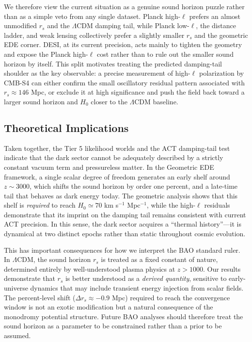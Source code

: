 \documentclass[a4paper,11pt]{article}
\begin{document}
We therefore view the current situation as a genuine sound horizon puzzle rather than as a simple veto from any single dataset. Planck high-$\ell$ prefers an almost unmodified $r_s$ and the $\Lambda$CDM damping tail, while Planck low-$\ell$, the distance ladder, and weak lensing collectively prefer a slightly smaller $r_s$ and the geometric EDE corner. DESI, at its current precision, acts mainly to tighten the geometry and expose the Planck high-$\ell$ cost rather than to rule out the smaller sound horizon by itself. This split motivates treating the predicted damping-tail shoulder as the key observable: a precise measurement of high-$\ell$ polarization by CMB-S4 can either confirm the small oscillatory residual pattern associated with $r_s \approx 146$ Mpc, or exclude it at high significance and push the field back toward a larger sound horizon and $H_0$ closer to the $\Lambda$CDM baseline.

\subsection*{Theoretical Implications}

Taken together, the Tier 5 likelihood worlds and the ACT damping-tail test indicate that the dark sector cannot be adequately described by a strictly constant vacuum term and pressureless matter. In the Geometric EDE framework, a single scalar degree of freedom generates an early shelf around $z \sim 3000$, which shifts the sound horizon by order one percent, and a late-time tail that behaves as dark energy today. The geometric analysis shows that this shelf is \emph{required} to reach $H_0 \simeq 70$ km s$^{-1}$ Mpc$^{-1}$, while the high-$\ell$ residuals demonstrate that its imprint on the damping tail remains consistent with current ACT precision. In this sense, the dark sector acquires a ``thermal history''---it is dynamical at two distinct epochs rather than static throughout cosmic evolution.

This has important consequences for how we interpret the BAO standard ruler. In $\Lambda$CDM, the sound horizon $r_s$ is treated as a fixed constant of nature, determined entirely by well-understood plasma physics at $z > 1000$. Our results demonstrate that $r_s$ is better understood as a \emph{derived quantity}, sensitive to early-universe dynamics that may include transient energy injection from scalar fields. The percent-level shift ($\Delta r_s \approx -0.9$ Mpc) required to reach the convergence window is not an exotic modification but a natural consequence of the monodromy potential structure. Future BAO analyses should therefore treat the sound horizon as a parameter to be constrained rather than a prior to be assumed.
\end{document}
